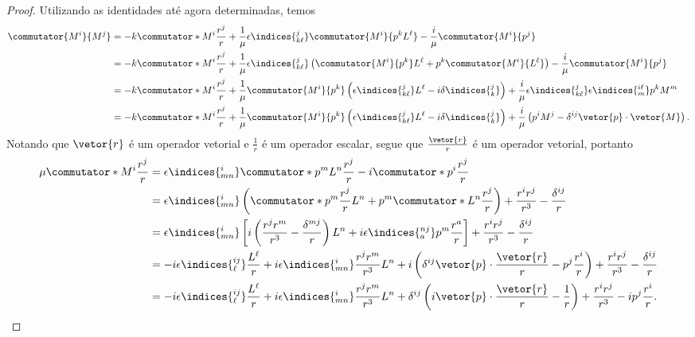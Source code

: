 \begin{proof}
   Utilizando as identidades até agora determinadas, temos
   \begin{align*}
      \commutator{M^i}{M^j} &= -k\commutator*{M^i}{\frac{r^j}{r}} + \frac1{\mu} \epsilon\indices{^j_{k \ell}}\commutator{M^i}{p^k L^\ell} - \frac{i}{\mu} \commutator{M^i}{p^j}\\
                            &= -k\commutator*{M^i}{\frac{r^j}{r}} + \frac{1}{\mu} \epsilon\indices{^j_{k\ell}} \left(\commutator{M^i}{p^k} L^\ell + p^k \commutator{M^i}{L^\ell}\right) - \frac{i}{\mu} \commutator{M^i}{p^j}\\
                            &= -k \commutator*{M^i}{\frac{r^j}{r}} + \frac{1}{\mu}\commutator{M^i}{p^k}\left(\epsilon\indices{^j_{k \ell}} L^\ell - i \delta\indices{^j_k}\right) + \frac{i}{\mu} \epsilon\indices{^j_{k\ell}} \epsilon\indices{^{i\ell}_m}p^k M^m\\
                            &= -k \commutator*{M^i}{\frac{r^j}{r}} + \frac{1}{\mu}\commutator{M^i}{p^k}\left(\epsilon\indices{^j_{k \ell}} L^\ell - i \delta\indices{^j_k}\right) + \frac{i}{\mu} \left(p^i M^j - \delta^{ij} \vetor{p} \cdot \vetor{M}\right).
   \end{align*}
   Notando que \(\vetor{r}\) é um operador vetorial e \(\frac{1}{r}\) é um operador escalar, segue que \(\frac{\vetor{r}}{r}\) é um operador vetorial, portanto
   \begin{align*}
      \mu\commutator*{M^i}{\frac{r^j}{r}} &= \epsilon\indices{^i_{mn}}\commutator*{p^m L^n}{\frac{r^j}{r}} - i \commutator*{p^i}{\frac{r^j}{r}}\\
                                          &= \epsilon\indices{^i_{mn}} \left(\commutator*{p^m}{\frac{r^j}{r}} L^n + p^m \commutator*{L^n}{\frac{r^j}{r}}\right) + \frac{r^i r^j}{r^3} - \frac{\delta^{ij}}{r}\\
                                          &= \epsilon\indices{^i_{mn}} \left[i\left(\frac{r^j r^m}{r^3} - \frac{\delta^{mj}}{r}\right)L^n +i \epsilon\indices{^{nj}_a} p^m \frac{r^a}{r}\right] + \frac{r^i r^j}{r^3} - \frac{\delta^{ij}}{r}\\
                                          &= -i\epsilon\indices{^{ij}_\ell} \frac{L^\ell}{r} + i\epsilon\indices{^i_{mn}} \frac{r^j r^m}{r^3} L^n + i \left(\delta^{ij} \vetor{p} \cdot \frac{\vetor{r}}{r} - p^j\frac{r^i}{r}\right) + \frac{r^i r^j}{r^3} - \frac{\delta^{ij}}{r}\\
                                          &= -i\epsilon\indices{^{ij}_\ell} \frac{L^\ell}{r} + i\epsilon\indices{^i_{mn}} \frac{r^j r^m}{r^3} L^n + \delta^{ij} \left(i \vetor{p} \cdot \frac{\vetor{r}}{r} - \frac{1}{r}\right) + \frac{r^i r^j}{r^3} - i p^j \frac{r^i}{r}.

\end{align*}
\end{proof}
